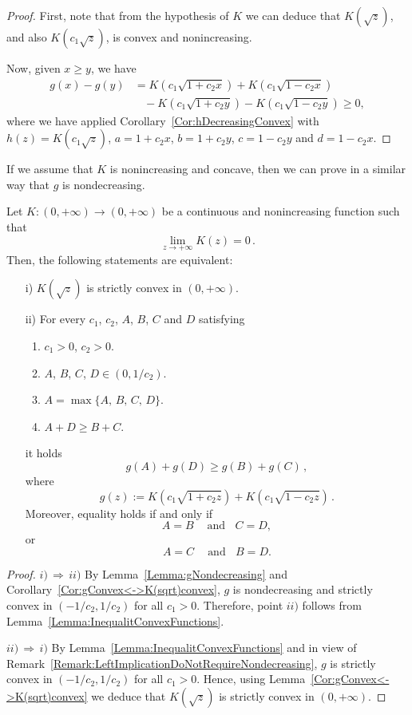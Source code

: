 \begin{proof}
First, note that from the hypothesis of $K$ we can deduce that $K(\sqrt{z})$, and also
$K(c_1\sqrt{z})$, is convex and nonincreasing.

Now, given $x\geq y$, we have
\begin{align*}
g(x)-g(y) &= K(c_1\sqrt{1+c_2 x}) + K(c_1\sqrt{1-c_2 x}) \\
&\ \ \ \ - K(c_1\sqrt{1+c_2 y}) -K(c_1\sqrt{1-c_2 y}) \geq 0,
\end{align*}
where we have applied Corollary~\ref{Cor:hDecreasingConvex} with $h(z) = K(c_1\sqrt{z})$,
$a=1+c_2x$, $b=1+c_2y$, $c=1-c_2y$ and $d=1-c_2x$.
\end{proof}

\begin{remark}
If we assume that $K$ is nonincreasing and concave, then we can prove in a similar way that $g$ is
nondecreasing.
\end{remark}


\begin{proposition}
\label{Prop:EquivalenceK(sqrt)Convex<->Inequality}
Let $K:(0, +\infty) \to (0,+\infty)$ be a continuous and nonincreasing function such that
$$
\lim_{z\to +\infty} K(z) = 0\,.
$$
Then, the following statements are equivalent:
\begin{enumerate}
\item[i)] $K(\sqrt{z})$ is strictly convex in $(0, +\infty)$.
\item[ii)] For every $c_1$, $c_2$, $A$, $B$, $C$ and $D$ satisfying
  \begin{enumerate}
    \item $c_1 > 0$, $c_2>0$.
    \item $A$, $B$, $C$, $D \in (0, 1/c_2)$.
	\item $A = \max\{A,\, B,\, C,\, D\}$.
    \item $A + D \geq B + C$.
  \end{enumerate}
  it holds
  $$
  g(A) + g(D) \geq g(B) + g(C)\,,
  $$
  where
  $$
  g(z) := K(c_1 \sqrt{1 + c_2z}) + K(c_1 \sqrt{1 - c_2z})\,.
  $$
  Moreover, equality holds if and only if
  $$ A = B \ \ \ \ \textrm{ and} \ \ \ \ C=D, $$
  or
  $$ A = C \ \ \ \ \textrm{ and} \ \ \ \ B=D. $$
\end{enumerate}
\end{proposition}

\begin{proof}
$i)\, \Rightarrow \,ii)$ By Lemma~\ref{Lemma:gNondecreasing} and
Corollary~\ref{Cor:gConvex<->K(sqrt)convex}, $g$ is nondecreasing and strictly convex in
$(-1/c_2,1/c_2)$ for all $c_1>0$. Therefore, point $ii)$ follows from
Lemma~\ref{Lemma:InequalitConvexFunctions}.

$ii)\, \Rightarrow \,i)$ By Lemma~\ref{Lemma:InequalitConvexFunctions} and in view of
Remark~\ref{Remark:LeftImplicationDoNotRequireNondecreasing}, $g$ is strictly convex in
$(-1/c_2,1/c_2)$ for all $c_1>0$. Hence, using Lemma~\ref{Cor:gConvex<->K(sqrt)convex} we deduce
that $K(\sqrt{z})$ is strictly convex in $(0, +\infty)$.
\end{proof}


